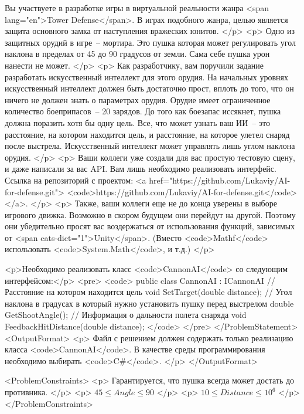 
Вы участвуете в разработке игры в виртуальной реальности жанра
  <span lang="en">Tower Defense</span>.
  В играх подобного жанра, целью является защита основного
  замка от наступления вражеских юнитов.
</p>
<p>
  Одно из защитных орудий в игре~-- мортира.
  Это пушка которая может регулировать угол наклона в пределах от 45 до 90 градусов от земли.
  Сама себе пушка урон нанести не может.
</p>
<p>
  Как разработчику, вам поручили задание разработать искусственный интеллект для этого орудия.
  На начальных уровнях искусственный интеллект должен быть достаточно прост,
  вплоть до того, что он ничего не должен знать о параметрах орудия.
  Орудие имеет ограниченное количество боеприпасов~-- 20 зарядов.
  До того как боезапас иссякнет, пушка должна поразить хотя бы одну цель.
  Все, что может узнать ваш ИИ~-- это расстояние, на котором находится цель,
  и расстояние, на которое улетел снаряд после выстрела.
  Искусственный интеллект может управлять лишь углом наклона орудия.
</p>
<p>
  Ваши коллеги уже создали для вас простую тестовую сцену, и даже написали за вас API.
  Вам лишь необходимо реализовать интерфейс.
  Ссылка на репозиторий с проектом:
  <a href="https://github.com/Lukaviy/AI-for-defense.git">
      <code>https://github.com/Lukaviy/AI-for-defense.git</code></a>.
</p>
<p>
  Также, ваши коллеги еще не до конца уверены в выборе игрового движка.
  Возможно в скором будущем они перейдут на другой.
  Поэтому они убедительно просят вас воздержаться от использования функций,
  зависимых от <span cats-dict="1">Unity</span>.
  (Вместо <code>Mathf</code> использовать <code>System.Math</code>, и т.д.)
 </p>

 <p>Необходимо реализовать класс <code>CannonAI</code> со следующим интерфейсом:</p>
   <pre>
     <code>
        public class CannonAI : ICannonAI
        {
            // Расстояние на котором находится цель
            void SetTarget(double distance);
            // Угол наклона в градусах в который нужно установить пушку перед выстрелом
            double GetShootAngle();
            // Информация о дальности полета снаряда
            void FeedbackHitDistance(double distance);
        }
      </code>
   </pre>
</ProblemStatement>
<OutputFormat>
  <p>
     Файл с решением должен содержать только реализацию класса <code>CannonAI</code>.
     В качестве среды программирования необходимо выбирать <code>C#</code>.
  </p>
</OutputFormat>

<ProblemConstraints>
<p>
Гарантируется, что пушка всегда может достать до противника.
</p>
<p>
$45 \le Angle \le 90$
</p>
<p>
$10 \le Distance \le 10^6$
</p>
</ProblemConstraints>

